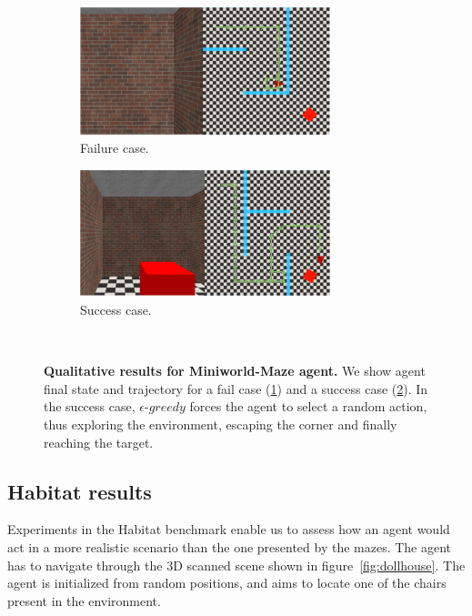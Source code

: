 \begin{figure}
    \centering
    \begin{subfigure}[b]{0.4\textwidth}
        \centering
        \includegraphics[width=0.8\textwidth]{figures/understanding_vsn/qualitative_results/fail}
        \caption{Failure case.}
        \label{fig:maze_qualitative_fail}
    \end{subfigure}
    \hfill
    \begin{subfigure}[b]{0.4\textwidth}
        \centering
        \includegraphics[width=0.8\textwidth]{figures/understanding_vsn/qualitative_results/success}
        \caption{Success case.}
        \label{fig:maze_qualitative_success}
    \end{subfigure}~\caption{\textbf{Qualitative results for Miniworld-Maze agent.} We show agent final state and trajectory for a fail case (\ref{fig:maze_qualitative_fail}) and a success case (\ref{fig:maze_qualitative_success}). In the success case, $\epsilon\text{-}greedy$ forces the agent to select a random action, thus exploring the environment, escaping the corner and finally reaching the target.}
    \label{fig:maze_qualitative}
\end{figure}

\subsection{Habitat results}\label{subsec:habitat-results}
Experiments in the Habitat benchmark enable us to assess how an agent would act in a more realistic scenario than the one presented by the mazes.
The agent has to navigate through the 3D scanned scene shown in figure~\ref{fig:dollhouse}.
The agent is initialized from random positions, and aims to locate one of the chairs present in the environment.

